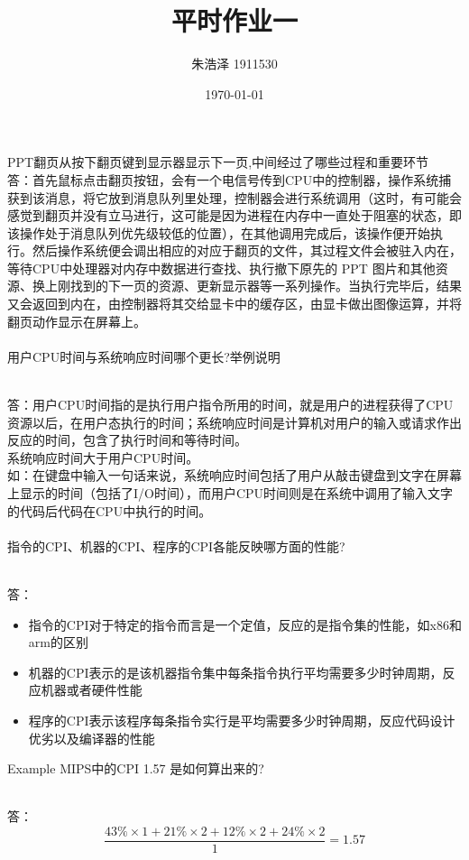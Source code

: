 \documentclass{homework}
\author{朱浩泽 1911530}
\date{\today}
\title{\Large{平时作业一}}
\begin{document}
 \maketitle

\question \large{PPT翻页从按下翻页键到显示器显示下一页,中间经过了哪些过程和重要环节}
\normalsize
~\\
答：首先鼠标点击翻页按钮，会有一个电信号传到CPU中的控制器，操作系统捕获到该消息，将它放到消息队列里处理，控制器会进行系统调用（这时，有可能会感觉到翻页并没有立马进行，这可能是因为进程在内存中一直处于阻塞的状态，即该操作处于消息队列优先级较低的位置），在其他调用完成后，该操作便开始执行。然后操作系统便会调出相应的对应于翻页的文件，其过程文件会被驻入内在，等待CPU中处理器对内存中数据进行查找、执行撤下原先的 PPT 图片和其他资源、换上刚找到的下一页的资源、更新显示器等一系列操作。当执行完毕后，结果又会返回到内在，由控制器将其交给显卡中的缓存区，由显卡做出图像运算，并将翻页动作显示在屏幕上。
~\\
~\\
\question \large{用户CPU时间与系统响应时间哪个更长?举例说明}

\normalsize
~\\
答：用户CPU时间指的是执行用户指令所用的时间，就是用户的进程获得了CPU资源以后，在用户态执行的时间；系统响应时间是计算机对用户的输入或请求作出反应的时间，包含了执行时间和等待时间。\\
系统响应时间大于用户CPU时间。\\
如：在键盘中输入一句话来说，系统响应时间包括了用户从敲击键盘到文字在屏幕上显示的时间（包括了I/O时间），而用户CPU时间则是在系统中调用了输入文字的代码后代码在CPU中执行的时间。
~\\
~\\

\question \large{指令的CPI、机器的CPI、程序的CPI各能反映哪方面的性能?}

\normalsize
~\\
答：
\begin{itemize}
	\item 指令的CPI对于特定的指令而言是一个定值，反应的是指令集的性能，如x86和arm的区别
	\item 机器的CPI表示的是该机器指令集中每条指令执行平均需要多少时钟周期，反应机器或者硬件性能
	\item 程序的CPI表示该程序每条指令实行是平均需要多少时钟周期，反应代码设计优劣以及编译器的性能
\end{itemize}
 


\question \large{Example MIPS中的CPI 1.57 是如何算出来的?}

\normalsize
~\\
答：
$$
\frac{43\% \times 1 + 21\% \times 2 + 12\% \times 2 + 24\% \times 2}{1} = 1.57
$$
\end{document}
